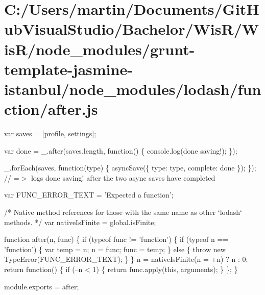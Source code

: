 \hypertarget{_c_1_2_users_2martin_2_documents_2_git_hub_visual_studio_2_bachelor_2_wis_r_2_wis_r_2node_modulea932b82425ee2bd3ff847f82cc61f43d}{}\section{C\+:/\+Users/martin/\+Documents/\+Git\+Hub\+Visual\+Studio/\+Bachelor/\+Wis\+R/\+Wis\+R/node\+\_\+modules/grunt-\/template-\/jasmine-\/istanbul/node\+\_\+modules/lodash/function/after.\+js}
var saves = \mbox{[}\textquotesingle{}profile\textquotesingle{}, \textquotesingle{}settings\textquotesingle{}\mbox{]};

var done = \+\_\+.\+after(saves.\+length, function() \{ console.\+log(\textquotesingle{}done saving!\textquotesingle{}); \});

\+\_\+.\+for\+Each(saves, function(type) \{ async\+Save(\{ \textquotesingle{}type\textquotesingle{}\+: type, \textquotesingle{}complete\textquotesingle{}\+: done \}); \}); // =$>$ logs \textquotesingle{}done saving!\textquotesingle{} after the two async saves have completed


\begin{DoxyCodeInclude}

var FUNC\_ERROR\_TEXT = \textcolor{stringliteral}{'Expected a function'};

\textcolor{comment}{/* Native method references for those with the same name as other `lodash` methods. */}
var nativeIsFinite = global.isFinite;

\textcolor{keyword}{function} after(n, func) \{
  \textcolor{keywordflow}{if} (typeof func != \textcolor{stringliteral}{'function'}) \{
    \textcolor{keywordflow}{if} (typeof n == \textcolor{stringliteral}{'function'}) \{
      var temp = n;
      n = func;
      func = temp;
    \} \textcolor{keywordflow}{else} \{
      \textcolor{keywordflow}{throw} \textcolor{keyword}{new} TypeError(FUNC\_ERROR\_TEXT);
    \}
  \}
  n = nativeIsFinite(n = +n) ? n : 0;
  \textcolor{keywordflow}{return} \textcolor{keyword}{function}() \{
    \textcolor{keywordflow}{if} (--n < 1) \{
      \textcolor{keywordflow}{return} func.apply(\textcolor{keyword}{this}, arguments);
    \}
  \};
\}

module.exports = after;
\end{DoxyCodeInclude}
 